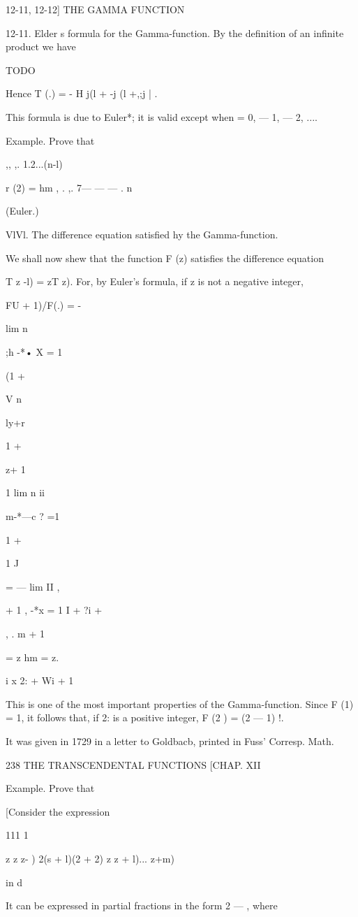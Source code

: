 12-11, 12-12] THE GAMMA FUNCTION

12-11. Elder s formula for the Gamma-function. By the definition of an
infinite product we have

TODO

Hence T (.) = - H j(l + -j (l +,;j | .

This formula is due to Euler*; it is valid except when = 0, — 1, — 2,
....

Example. Prove that

,, ,. 1.2...(n-l)

r (2) = hm , . ,. 7— — — . n\

(Euler.)

VlVl. The difference equation satisfied hy the Gamma-function.

We shall now shew that the function F (z) satisfies the difference
equation

T z -l) = zT z). For, by Euler's formula, if z is not a negative
integer,

FU + 1)/F(.) = -

lim n

;h -*• X = 1

(1 +

V n

ly+r

1 +

z+ 1

1 lim n ii

m-*---c ? =1

1 +

1 J

= — lim II ,

  + 1 , -*x = 1 I + ?i +

, . m + 1

= z hm = z.

 i x 2: + Wi + 1

This is one of the most important properties of the Gamma-function.
Since F (1) = 1, it follows that, if 2: is a positive integer, F (2 )
= (2 — 1) !.

It was given in 1729 in a letter to Goldbacb, printed in Fuss'
Corresp. Math.

238 THE TRANSCENDENTAL FUNCTIONS [CHAP. XII

Example. Prove that

[Consider the expression

111 1

z z z- ) 2(s + l)(2 + 2) z z + l)... z+m)

in d

It can be expressed in partial fractions in the form 2 — , where

